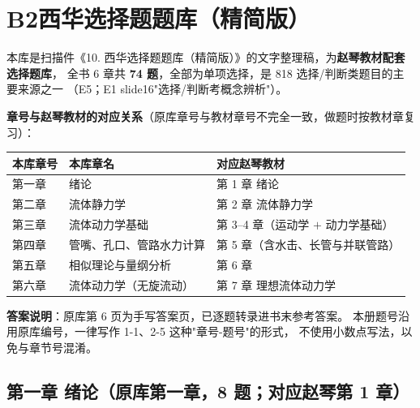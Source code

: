 \chapter*{B2\quad 西华选择题题库（精简版）}

\begin{tishi}
本库是扫描件《10. 西华选择题题库（精简版）》的文字整理稿，为\textbf{赵琴教材配套选择题库}，
全书 6 章共 \textbf{74 题}，全部为单项选择，是 818 选择/判断类题目的主要来源之一
（E5；E1 slide16"选择/判断考概念辨析"）。

\textbf{章号与赵琴教材的对应关系}（原库章号与教材章号不完全一致，做题时按教材章复习）：

\begin{center}
\begin{tabularx}{\textwidth}{@{}lXl@{}}
\toprule
本库章号 & 本库章名 & 对应赵琴教材 \\
\midrule
第一章 & 绪论 & 第 1 章 绪论 \\
第二章 & 流体静力学 & 第 2 章 流体静力学 \\
第三章 & 流体动力学基础 & 第 3--4 章（运动学 $+$ 动力学基础） \\
第四章 & 管嘴、孔口、管路水力计算 & 第 5 章（含水击、长管与并联管路） \\
第五章 & 相似理论与量纲分析 & 第 6 章 \\
第六章 & 流体动力学（无旋流动） & 第 7 章 理想流体动力学 \\
\bottomrule
\end{tabularx}
\end{center}

\textbf{答案说明}：原库第 6 页为手写答案页，已逐题转录进书末参考答案。
本册题号沿用原库编号，一律写作 1-1、2-5 这种"章号-题号"的形式，
不使用小数点写法，以免与章节号混淆。
\end{tishi}

\section*{第一章 绪论（原库第一章，8 题；对应赵琴第 1 章）}

